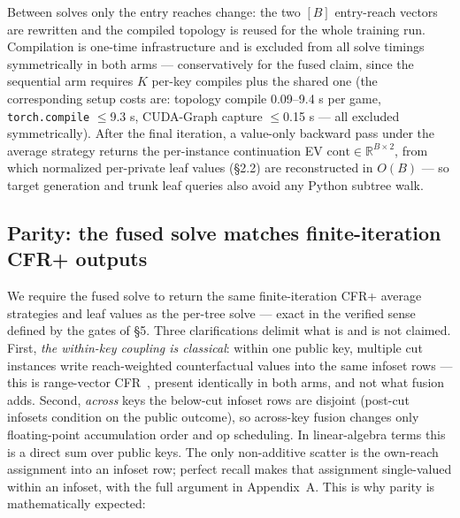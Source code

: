 \documentclass[11pt]{article}
\begin{document}
Between solves only the entry reaches change: the two $[B]$ entry-reach vectors are
rewritten and the compiled topology is reused for the whole training run. Compilation is
one-time infrastructure and is excluded from all solve timings symmetrically in both
arms --- conservatively for the fused claim, since the sequential arm requires $K$
per-key compiles plus the shared one (the corresponding setup costs are: topology
compile 0.09--9.4 s per game,
\texttt{torch.compile} $\le$9.3 s, CUDA-Graph capture $\le$0.15 s --- all excluded
symmetrically). After the final iteration, a
value-only backward pass under the average strategy returns the per-instance
continuation EV $\text{cont} \in \mathbb{R}^{B \times 2}$, from which normalized
per-private leaf values (\S2.2) are reconstructed in $O(B)$ --- so target generation and
trunk leaf queries also avoid any Python subtree walk.

\subsection{Parity: the fused solve matches finite-iteration CFR+ outputs}

We require the fused solve to return the same finite-iteration CFR+ average strategies
and leaf values as the per-tree solve --- exact in the verified sense defined by the
gates of \S5. Three clarifications delimit what is and is not claimed. First, \emph{the
within-key coupling is classical}:
within one public key, multiple cut instances write reach-weighted counterfactual values
into the same infoset rows --- this is range-vector
CFR~\citep{Johanson2011,Johanson2012}, present identically in both arms, and not what
fusion adds. Second, \emph{across} keys the below-cut infoset rows are disjoint
(post-cut infosets condition on the public outcome), so across-key fusion changes only
floating-point accumulation order and op scheduling. In linear-algebra terms this is a
direct sum over public keys. The only non-additive scatter is the own-reach assignment
into an infoset row; perfect recall makes that assignment single-valued within an
infoset, with the full argument in Appendix~A. This is why parity is mathematically
expected:
\end{document}
